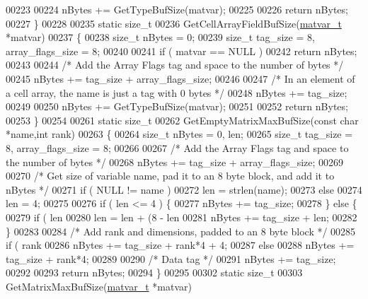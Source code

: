 \begin{DoxyCode}
00223 
00224     nBytes += GetTypeBufSize(matvar);
00225 
00226     \textcolor{keywordflow}{return} nBytes;
00227 \}
00228 
00235 \textcolor{keyword}{static} \textcolor{keywordtype}{size\_t}
00236 GetCellArrayFieldBufSize(\hyperlink{group___m_a_t_structmatvar__t}{matvar\_t} *matvar)
00237 \{
00238     \textcolor{keywordtype}{size\_t} nBytes = 0;
00239     \textcolor{keywordtype}{size\_t} tag\_size = 8, array\_flags\_size = 8;
00240 
00241     \textcolor{keywordflow}{if} ( matvar == NULL )
00242         \textcolor{keywordflow}{return} nBytes;
00243 
00244     \textcolor{comment}{/* Add the Array Flags tag and space to the number of bytes */}
00245     nBytes += tag\_size + array\_flags\_size;
00246 
00247     \textcolor{comment}{/* In an element of a cell array, the name is just a tag with 0 bytes */}
00248     nBytes += tag\_size;
00249 
00250     nBytes += GetTypeBufSize(matvar);
00251 
00252     \textcolor{keywordflow}{return} nBytes;
00253 \}
00254 
00261 \textcolor{keyword}{static} \textcolor{keywordtype}{size\_t}
00262 GetEmptyMatrixMaxBufSize(\textcolor{keyword}{const} \textcolor{keywordtype}{char} *name,\textcolor{keywordtype}{int} rank)
00263 \{
00264     \textcolor{keywordtype}{size\_t} nBytes = 0, len;
00265     \textcolor{keywordtype}{size\_t} tag\_size = 8, array\_flags\_size = 8;
00266 
00267     \textcolor{comment}{/* Add the Array Flags tag and space to the number of bytes */}
00268     nBytes += tag\_size + array\_flags\_size;
00269 
00270     \textcolor{comment}{/* Get size of variable name, pad it to an 8 byte block, and add it to nBytes */}
00271     \textcolor{keywordflow}{if} ( NULL != name )
00272         len = strlen(name);
00273     \textcolor{keywordflow}{else}
00274         len = 4;
00275 
00276     \textcolor{keywordflow}{if} ( len <= 4 ) \{
00277         nBytes += tag\_size;
00278     \} \textcolor{keywordflow}{else} \{
00279         \textcolor{keywordflow}{if} ( len %
00280             len = len + (8 - len %
00281         nBytes += tag\_size + len;
00282     \}
00283 
00284     \textcolor{comment}{/* Add rank and dimensions, padded to an 8 byte block */}
00285     \textcolor{keywordflow}{if} ( rank %
00286         nBytes += tag\_size + rank*4 + 4;
00287     \textcolor{keywordflow}{else}
00288         nBytes += tag\_size + rank*4;
00289 
00290     \textcolor{comment}{/* Data tag */}
00291     nBytes += tag\_size;
00292 
00293     \textcolor{keywordflow}{return} nBytes;
00294 \}
00295 
00302 \textcolor{keyword}{static} \textcolor{keywordtype}{size\_t}
00303 GetMatrixMaxBufSize(\hyperlink{group___m_a_t_structmatvar__t}{matvar\_t} *matvar)

\end{DoxyCode}
